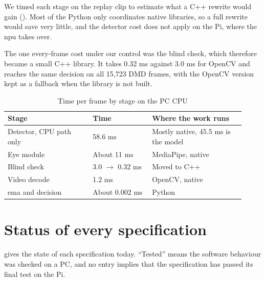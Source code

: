 We timed each stage on the replay clip to estimate what a C++ rewrite would gain (). Most of the Python only coordinates native libraries, so a full rewrite would save very little, and the detector cost does not apply on the Pi, where the \gls{npu} takes over.

The one every-frame cost under our control was the blind check, which therefore became a small C++ library. It takes 0.32 ms against 3.0 ms for OpenCV and reaches the same decision on all 15{,}723 DMD frames, with the OpenCV version kept as a fallback when the library is not built.

\begin{table}[htbp]
\centering
\caption{Time per frame by stage on the PC CPU}
\label{tab:stages}
\footnotesize
\setlength{\tabcolsep}{3pt}
\renewcommand{\arraystretch}{1.15}
\begin{tabular}{|p{0.330\linewidth}|p{0.230\linewidth}|p{0.360\linewidth}|}
\hline
\textbf{Stage} & \textbf{Time} & \textbf{Where the work runs} \\
\hline
Detector, CPU path only & 58.6 ms & Mostly native, 45.5 ms is the model \\
\hline
Eye module & About 11 ms & MediaPipe, native \\
\hline
Blind check & 3.0 $\rightarrow$ 0.32 ms & Moved to C++ \\
\hline
Video decode & 1.2 ms & OpenCV, native \\
\hline
\gls{ema} and decision & About 0.002 ms & Python \\
\hline
\end{tabular}
\end{table}

\section{Status of every specification}

 gives the state of each specification today. ``Tested'' means the software behaviour was checked on a PC, and no entry implies that the specification has passed its final test on the Pi.

